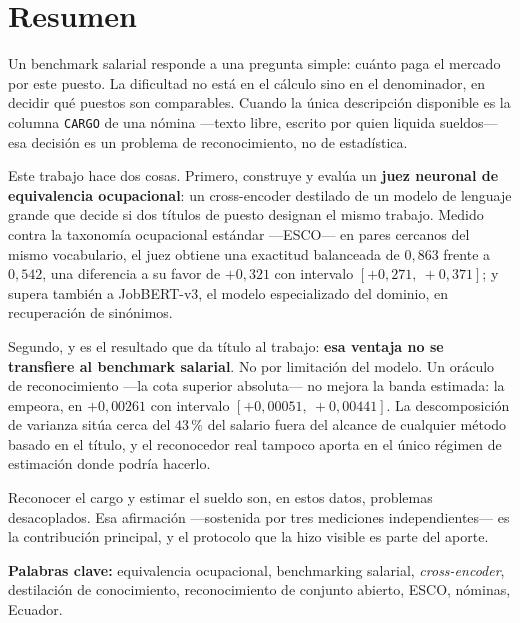 \documentclass[12pt,a4paper,oneside]{report}
\newcommand{\cargo}[1]{\texttt{#1}}
\begin{document}
\chapter*{Resumen}

Un benchmark salarial responde a una pregunta simple: cuánto paga el mercado por
este puesto. La dificultad no está en el cálculo sino en el denominador, en decidir
qué puestos son comparables. Cuando la única descripción disponible es la columna
\cargo{CARGO} de una nómina ---texto libre, escrito por quien liquida sueldos--- esa
decisión es un problema de reconocimiento, no de estadística.

Este trabajo hace dos cosas. Primero, construye y evalúa un \textbf{juez neuronal de
equivalencia ocupacional}: un cross-encoder destilado de un modelo de lenguaje grande
que decide si dos títulos de puesto designan el mismo trabajo. Medido contra la
taxonomía ocupacional estándar ---ESCO--- en pares cercanos del mismo vocabulario, el
juez obtiene una exactitud balanceada de $0{,}863$ frente a $0{,}542$, una diferencia
a su favor de $+0{,}321$ con intervalo $[+0{,}271,\ +0{,}371]$;
y supera también a JobBERT-v3, el modelo especializado del dominio, en recuperación de
sinónimos.

Segundo, y es el resultado que da título al trabajo: \textbf{esa ventaja no se
transfiere al benchmark salarial}. No por limitación del modelo. Un oráculo de
reconocimiento ---la cota superior absoluta--- no mejora la banda estimada: la empeora,
en $+0{,}00261$ con intervalo $[+0{,}00051,\ +0{,}00441]$.
La descomposición de varianza sitúa cerca del $43\,\%$ del salario fuera del alcance de
cualquier método basado en el título,
y el reconocedor real tampoco aporta en el único régimen de estimación donde podría
hacerlo.

Reconocer el cargo y estimar el sueldo son, en estos datos, problemas desacoplados. Esa
afirmación ---sostenida por tres mediciones independientes--- es la contribución
principal, y el protocolo que la hizo visible es parte del aporte.

\vspace{0.6cm}
\noindent\textbf{Palabras clave:} equivalencia ocupacional, benchmarking salarial,
\emph{cross-encoder}, destilación de conocimiento, reconocimiento de conjunto abierto,
ESCO, nóminas, Ecuador.
\end{document}

